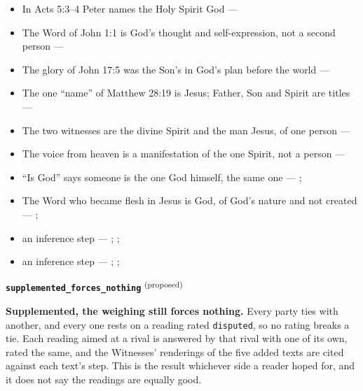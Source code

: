 \documentclass[11pt,paper=\testimonypaper,DIV=13,parskip=false]{scrartcl}
\begin{document}
\begin{itemize}
\begin{itemize}
\item In Acts 5:3–4 Peter names the Holy Spirit God --- \cite[198]{calvin-commentary-acts-1844}
\item The Word of John 1:1 is God’s thought and self-expression, not a second person --- \cite[ch. 4 and 8, on John 1:1]{bernard-oneness-of-god-1983}
\item The glory of John 17:5 was the Son’s in God’s plan before the world --- \cite[ch. 8, The Preexistence of Jesus]{bernard-oneness-of-god-1983}
\item The one “name” of Matthew 28:19 is Jesus; Father, Son and Spirit are titles --- \cite[ch. 6, Matthew 28:19]{bernard-oneness-of-god-1983}
\item The two witnesses are the divine Spirit and the man Jesus, of one person --- \cite[ch. 8, Two Witnesses]{bernard-oneness-of-god-1983}
\item The voice from heaven is a manifestation of the one Spirit, not a person --- \cite[ch. 8, The Voice from Heaven]{bernard-oneness-of-god-1983}
\item “Is God” says someone is the one God himself, the same one --- \cite[ch. 8, Are Jesus and the Father One in Purpose Only?]{bernard-oneness-of-god-1983}; \cite[27]{watchtower-should-you-believe-trinity-1989}
\item The Word who became flesh in Jesus is God, of God’s nature and not created --- \cite[3, The Triune God]{kibbey-living-systematic-theology-2026}; \cite[ch. 4, Conclusion]{bernard-oneness-of-god-1983}
\item an inference step --- \cite[3, The Triune God]{kibbey-living-systematic-theology-2026}; \cite[ch. 4, Conclusion]{bernard-oneness-of-god-1983}; \cite[17--19]{buzzard-caveat-lector-2001}
\item an inference step --- \cite[ch. 8, Are Jesus and the Father One in Purpose Only?]{bernard-oneness-of-god-1983}; \cite[27]{watchtower-should-you-believe-trinity-1989}; \cite[I, q. 28, a. 3]{aquinas-summa-1920}
\end{itemize}
\end{itemize}
\par\medskip\noindent\textbf{\texttt{supplemented\_\allowbreak{}forces\_\allowbreak{}nothing}} \textsuperscript{(proposed)}\par\nobreak\noindent
\textbf{Supplemented, the weighing still forces nothing.} Every party ties with another, and every one rests on a reading rated \texttt{disputed}, so no rating breaks a tie. Each reading aimed at a rival is answered by that rival with one of its own, rated the same, and the Witnesses’ renderings of the five added texts are cited against each text’s step. This is the result whichever side a reader hoped for, and it does not say the readings are equally good.
\end{document}
